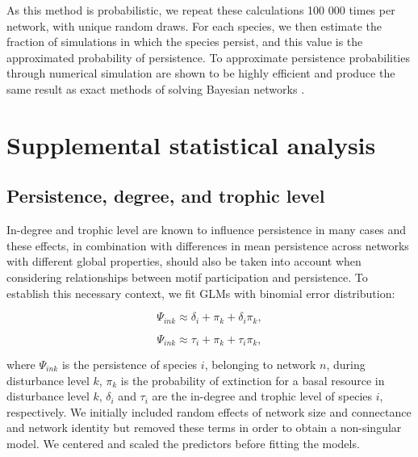 \documentclass[12pt]{article}
\begin{document}
\begin{spacing}{2.0}
        
        As this method is probabilistic, we repeat these calculations 100 000 times per network, with unique random draws.
        For each species, we then estimate the fraction of simulations in which the species persist, and this value is the approximated probability of persistence.
        To approximate persistence probabilities through numerical simulation are shown to be highly efficient and produce the same result as exact methods of solving Bayesian networks \citep{Haussler2020}.
        
        
\clearpage



\section{Supplemental statistical analysis}

    \subsection{Persistence, degree, and trophic level}
    
            In-degree and trophic level are known to influence persistence in many cases and these effects, in combination with differences in mean persistence across networks with different global properties, should also be taken into account when considering relationships between motif participation and persistence.
            To establish this necessary context, we fit GLMs with binomial error distribution:

            \begin{spacing}{1.0}
            \begin{multicols}{2}
            \begin{equation}
                    \Psi_{ink} \approx \delta_{i} + \pi_{k} + \delta_{i}\pi_{k},
                    \label{degeq}
                \end{equation}
        
            \begin{equation}
                    \Psi_{ink} \approx \tau_{i} + \pi_{k} + \tau_{i}\pi_{k},
                    \label{TLeq}
                \end{equation}
            \end{multicols}
            \end{spacing}
        
            \noindent where $\Psi_{ink}$ is the persistence of species $i$, belonging to network $n$, during disturbance level $k$, $\pi_k$ is the probability of extinction for a basal resource in disturbance level $k$, 
            $\delta_{i}$ and $\tau_i$ are the in-degree and trophic level of species $i$, respectively.
            We initially included random effects of network size and connectance and network identity but removed these terms in order to obtain a non-singular model.
            We centered and scaled the predictors before fitting the models.



\end{spacing}
\end{document}
